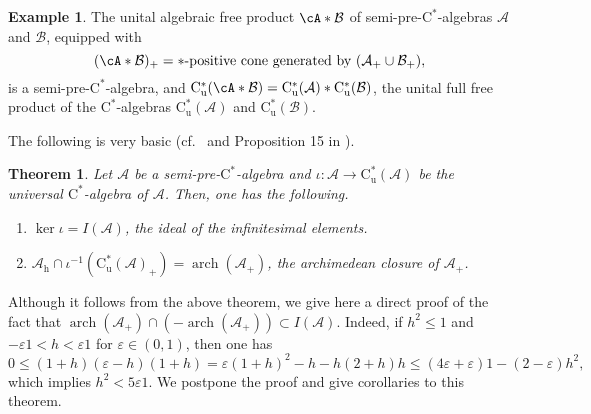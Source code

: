 \documentclass[12pt]{amsart}
\newtheorem{thm}{Theorem}
\theoremstyle{definition}
\newtheorem{exa}{Example}
\begin{document}
\begin{exa}\label{exa:freeprod}
The unital algebraic free product $\cA*{{\mathcal B}}$
of {semi-pre-$\mathrm{C}^*$-alge\-bra\xspace}{}s ${{\mathcal A}}$ and ${{\mathcal B}}$, equipped with
\[
(\cA*{{\mathcal B}})_+=\mbox{$*$-positive cone generated by }({{\mathcal A}}_+\cup {{\mathcal B}}_+),
\]
is a {semi-pre-$\mathrm{C}^*$-alge\-bra\xspace}, and
$\mathrm{C}^*_{\mathrm{u}}(\cA*{{\mathcal B}})=\mathrm{C}^*_{\mathrm{u}}({{\mathcal A}})*\mathrm{C}^*_{\mathrm{u}}({{\mathcal B}})$,
the unital full free product of the {$\mathrm{C}^*$-alge\-bra\xspace}{}s $\mathrm{C}^*_{\mathrm{u}}({{\mathcal A}})$ and $\mathrm{C}^*_{\mathrm{u}}({{\mathcal B}})$.
\end{exa}
The following is very basic
(cf.\ \cite{cimpric} and Proposition 15 in \cite{schmudgen}).

\begin{thm}\label{thm:fundamental}
Let ${{\mathcal A}}$ be a {semi-pre-$\mathrm{C}^*$-alge\-bra\xspace} and $\iota\colon {{\mathcal A}}\to \mathrm{C}^*_{\mathrm{u}}({{\mathcal A}})$
be the universal {$\mathrm{C}^*$-alge\-bra\xspace} of ${{\mathcal A}}$.
Then, one has the following.
\begin{enumerate}[$\bullet$]
\item
$\ker\iota=I({{\mathcal A}})$, the ideal of the infinitesimal elements.
\item
${{\mathcal A}}_{\mathrm{h}}\cap\iota^{-1}(\mathrm{C}^*_{\mathrm{u}}({{\mathcal A}})_+)=\operatorname*{arch}({{\mathcal A}}_+)$,
the archimedean closure of ${{\mathcal A}}_+$.
\end{enumerate}
\end{thm}

Although it follows from the above theorem, we give here a direct proof of the fact that
$\operatorname*{arch}({{\mathcal A}}_+)\cap (-\operatorname*{arch}({{\mathcal A}}_+)) \subset I({{\mathcal A}})$.
Indeed, if $h^2\le 1$ and $-{\varepsilon}1 < h <{\varepsilon}1$ for ${\varepsilon}\in(0,1)$, then one has
\[
0\le (1+h)({\varepsilon}-h)(1+h) = {\varepsilon}(1+h)^2 -h -h(2+h)h
\le (4{\varepsilon} + {\varepsilon})1 -(2-{\varepsilon})h^2,
\]
which implies $h^2 < 5{\varepsilon}1$.
We postpone the proof and give corollaries to this theorem.
\end{document}
